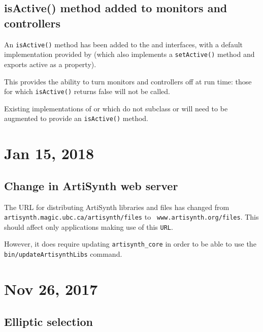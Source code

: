 \documentclass{article}
\begin{document}
\subsection*{isActive() method added to monitors and controllers}

An {\tt isActive()} method has been added to the
 and
 interfaces, with a
default implementation provided by
 (which also
implements a {\tt setActive()} method and exports {\sf active} as a
property).

This provides the ability to turn monitors and controllers off at run
time: those for which {\tt isActive()} returns false will not be
called.

Existing implementations of
 or
 which do not subclass
 or
 will need to be
augmented to provide an {\tt isActive()} method.


\section*{Jan 15, 2018}

\subsection*{Change in ArtiSynth web server}

The URL for distributing ArtiSynth libraries and files has changed
from {\tt artisynth.magic.ubc.ca/artisynth/files} to {\tt
www.artisynth.org/files}. This should affect only applications making
use of this {\tt URL}.

However, it does require updating {\tt artisynth\_core} in order to be
able to use the {\tt bin/updateArtisynthLibs} command.

\section*{Nov 26, 2017}

\subsection*{Elliptic selection}
\end{document}
